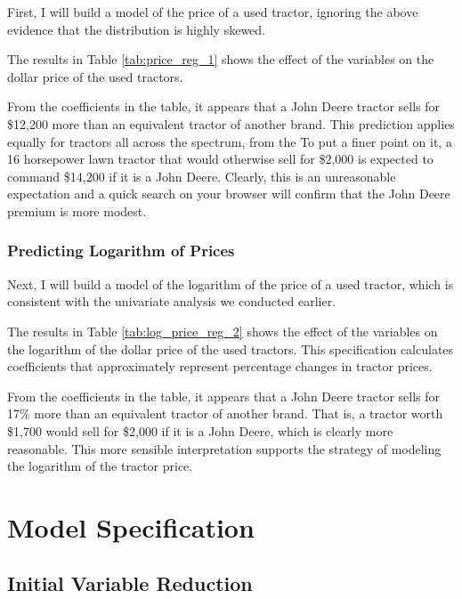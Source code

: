\documentclass[11pt]{paper}
\begin{document}
First, I will build a model of the price of a used tractor, 
ignoring the above evidence that the distribution is highly skewed. 



The results in Table \ref{tab:price_reg_1}
shows the effect of the variables on the dollar price of the
used tractors. 

From the coefficients in the table, 
it appears that a John Deere tractor sells for 
\$12,200 more than an equivalent tractor of another brand. 
This prediction applies equally for tractors all across the spectrum, from the 
To put a finer point on it, 
a 16 horsepower lawn tractor that would otherwise sell for \$2,000 is expected to command \$14,200 if it is a John Deere.
Clearly, this is an unreasonable expectation and
a quick search on your browser will confirm that the John Deere premium is more modest. 


\pagebreak
\subsubsection{Predicting Logarithm of Prices}

Next, I will build a model of the logarithm of the price 
of a used tractor, 
which is consistent with the univariate analysis we conducted earlier. 



The results in Table \ref{tab:log_price_reg_2}
shows the effect of the variables on the logarithm of the dollar price of the used tractors. 
This specification calculates coefficients that 
approximately represent percentage changes in 
tractor prices. 

From the coefficients in the table, 
it appears that a John Deere tractor sells for 
17\% more than an equivalent tractor of another brand. 
That is, a tractor worth \$1,700 would sell
for \$2,000 if it is a John Deere, 
which is clearly more reasonable. 
This more sensible interpretation supports 
the strategy of modeling the 
logarithm of the tractor price. 


\clearpage
\section{Model Specification}

\subsection{Initial Variable Reduction}
\end{document}
